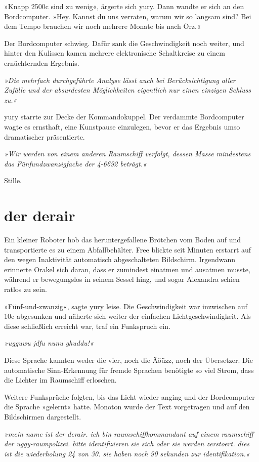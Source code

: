»Knapp 2500c sind zu wenig«, ärgerte sich yury. Dann wandte er sich an den Bordcomputer. »Hey. Kannst du uns verraten, warum wir so langsam sind? Bei dem Tempo brauchen wir noch mehrere Monate bis nach Örz.«

Der Bordcomputer schwieg. Dafür sank die Geschwindigkeit noch weiter, und hinter den Kulissen kamen mehrere elektronische Schaltkreise zu einem ernüchternden Ergebnis.

\textit{»Die mehrfach durchgeführte Analyse lässt auch bei Berücksichtigung aller Zufälle und der absurdesten Möglichkeiten eigentlich nur einen einzigen Schluss zu.«}

yury starrte zur Decke der Kommandokuppel. Der verdammte Bordcomputer wagte es ernsthaft, eine Kunstpause einzulegen, bevor er das Ergebnis umso dramatischer präsentierte.

\textit{»Wir werden von einem anderen Raumschiff verfolgt, dessen Masse mindestens das Fünfundzwanzigfache der 4-6692 beträgt.«}

\bigskip

Stille.


\chapter{der derair}

Ein kleiner Roboter hob das heruntergefallene Brötchen vom Boden auf und transportierte es zu einem Abfallbehälter. Free blickte seit Minuten erstarrt auf den wegen Inaktivität automatisch abgeschalteten Bildschirm. Irgendwann erinnerte Orakel sich daran, dass er zumindest einatmen und ausatmen musste, während er bewegungslos in seinem Sessel hing, und sogar Alexandra schien ratlos zu sein.

»Fünf-und-zwanzig«, sagte yury leise. Die Geschwindigkeit war inzwischen auf 10c abgesunken und näherte sich weiter der einfachen Lichtgeschwindigkeit. Als diese schließlich erreicht war, traf ein Funkspruch ein.

\textit{»ugguwu jdfu nunu ghuddu!«}

Diese Sprache kannten weder die vier, noch die Äöüzz, noch der Übersetzer. Die automatische Sinn-Erkennung für fremde Sprachen benötigte so viel Strom, dass die Lichter im Raumschiff erloschen.

Weitere Funksprüche folgten, bis das Licht wieder anging und der Bordcomputer die Sprache »gelernt« hatte. Monoton wurde der Text vorgetragen und auf den Bildschirmen dargestellt.

\textit{»mein name ist der derair. ich bin raumschiffkommandant auf einem raumschiff der uggy-raumpolizei. bitte identifizieren sie sich oder sie werden zerstoert. dies ist die wiederholung 24 von 30. sie haben noch 90 sekunden zur identifikation.«}

